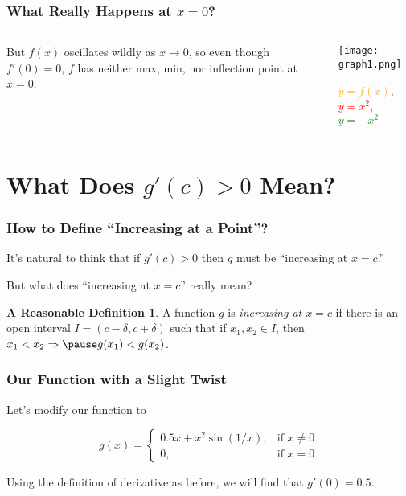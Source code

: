 \documentclass{beamer}
\theoremstyle{definition} %
\newtheorem*{dfn}{A Reasonable Definition}
\begin{document}
\begin{frame}
    \frametitle{What Really Happens at $x=0$?}
    \begin{columns} %
    \begin{column}{0.5\textwidth} %
    But $f(x)$ oscillates wildly as $x\to 0$, so even though $f'(0)=0$, $f$ has neither max, min, nor inflection point at $x=0$.
    \end{column}

    \pause

    \begin{column}{0.5\textwidth} %
    \texttt{[image: graph1.png]} %
    \begin{center}
    \textcolor{orange}{$y=f(x)$}, \textcolor{red}{$y=x^2$}, \textcolor{green}{$y=-x^2$} %
    \end{center}
    \end{column}
    \end{columns}
\end{frame}

\section{What Does $g'(c)>0$ Mean?}

\begin{frame}
    \frametitle{How to Define ``Increasing at a Point''?}
    It's natural to think that if $g'(c)>0$ then $g$ must be ``increasing at $x=c$.''

    \pause But what does ``increasing at $x=c$'' really mean?

    \pause \begin{dfn} %
    A function $g$ is \emph{increasing at $x=c$} if there is an open interval $I=(c-\delta,c+\delta)$ such that \pause if $x_1, x_2\in I$, \pause then $x_1<x_2\Rightarrow \pause g(x_1)<g(x_2)$.
    \end{dfn}
\end{frame}

\begin{frame}
    \frametitle{Our Function with a Slight Twist}
    Let's modify our function to

    $$ g(x)=
    \begin{cases}
    0.5x+x^2\sin(1/x), &\text{if }x\neq0 \\
    0, &\text{if }x=0
    \end{cases}
    $$

    Using the definition of derivative as before, we will find that $g'(0)=0.5$.
\end{frame}
\end{document}

